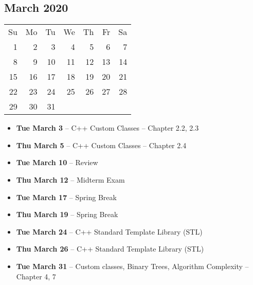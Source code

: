 \documentclass{article}
\begin{document}
\subsection*{March 2020}
\begin{tabular}{rrrrrrr}
Su & Mo & Tu & We & Th & Fr & Sa\\
 1 &  2 &  3 &  4 &  5 &  6 &  7\\ 
 8 &  9 & 10 & 11 & 12 & 13 & 14\\ 
15 & 16 & 17 & 18 & 19 & 20 & 21\\ 
22 & 23 & 24 & 25 & 26 & 27 & 28\\
29 & 30 & 31 &    &    &    & \\
\end{tabular}
\begin{itemize}
\item \textbf{Tue March  3} 
    -- C++ Custom Classes
    -- Chapter 2.2, 2.3
\item \textbf{Thu March  5} 
    -- C++ Custom Classes
    -- Chapter 2.4
\item \textbf{Tue March 10} -- Review
\item \textbf{Thu March 12} -- Midterm Exam
\item \textbf{Tue March 17} -- Spring Break
\item \textbf{Thu March 19} -- Spring Break
\item \textbf{Tue March 24} -- C++ Standard Template Library (STL)
\item \textbf{Thu March 26} -- C++ Standard Template Library (STL)
\item \textbf{Tue March 31} 
    -- Custom classes, Binary Trees, Algorithm Complexity
    -- Chapter 4, 7
\end{itemize}
\end{document}
